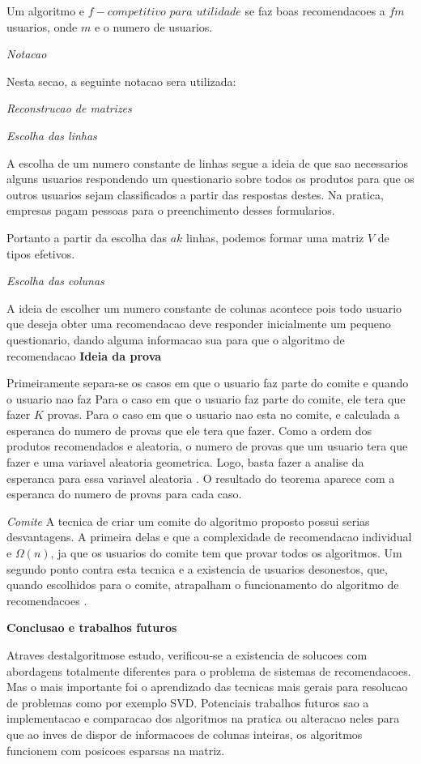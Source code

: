\documentclass[a4paper,10pt]{article}
\begin{document}
Um algoritmo e $f-competitivo$ $para$ $utilidade$
se faz boas recomendacoes a $fm$ usuarios, onde $m$ e o numero de usuarios. 

\textit{Notacao}

Nesta secao, a seguinte notacao sera utilizada:

\textit{Reconstrucao de matrizes}

\textit{Escolha das linhas}

A escolha de um numero constante de linhas segue a ideia de que sao necessarios
alguns usuarios respondendo um questionario sobre todos os produtos para que os
outros usuarios sejam classificados a partir das respostas destes. Na pratica, empresas
pagam pessoas para o preenchimento desses formularios.

Portanto a partir da escolha das $ak$ linhas, podemos formar uma matriz $V$ de tipos efetivos.

\textit{Escolha das colunas}

A ideia de escolher um numero constante de colunas acontece pois todo usuario
que deseja obter uma recomendacao deve responder inicialmente um pequeno 
questionario, dando alguma informacao sua para que o algoritmo de recomendacao
\textbf{Ideia da prova}

Primeiramente separa-se os casos em que o usuario faz parte do comite e quando
o usuario nao faz 
Para o caso em que o usuario faz parte do comite, ele tera que fazer $K$ provas.
Para o caso em que o usuario nao esta no comite, e calculada a esperanca do numero 
de provas que ele tera que fazer. Como a ordem dos produtos
recomendados e aleatoria, o numero de provas que um usuario tera que fazer
e uma variavel aleatoria geometrica. Logo, basta fazer a analise da esperanca
para essa variavel aleatoria \cite{MG}.
O resultado do teorema aparece com a esperanca do numero de provas para
cada caso.

\textit{Comite}
A tecnica de criar um comite do algoritmo proposto possui serias
desvantagens. 
A primeira delas e que a complexidade de recomendacao individual
e $\Omega(n)$, ja que os usuarios do comite tem que provar todos os
algoritmos. 
Um segundo ponto contra esta tecnica e a existencia de usuarios desonestos,
que, quando escolhidos para o comite, atrapalham o funcionamento do 
algoritmo de recomendacoes \cite{Boney96}.

\textbf{Conclusao e trabalhos futuros}

Atraves destalgoritmose estudo, verificou-se a existencia de solucoes com abordagens
totalmente diferentes para o problema de sistemas de recomendacoes. Mas o mais
importante foi o aprendizado das tecnicas mais gerais para resolucao de problemas
como por exemplo SVD. 
Potenciais trabalhos futuros sao a implementacao e comparacao dos algoritmos na pratica
ou alteracao neles para que ao inves de dispor de informacoes de colunas inteiras, os
algoritmos funcionem com posicoes esparsas na matriz. 
\end{document}

